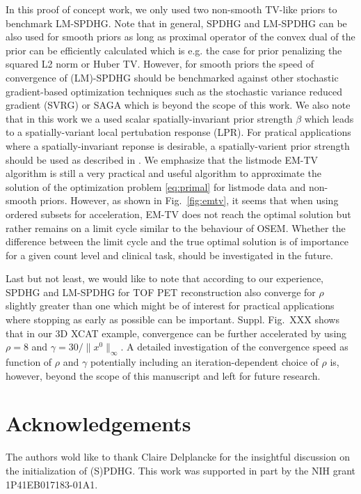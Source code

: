 In this proof of concept work, we only used two non-smooth TV-like priors
to benchmark LM-SPDHG. 
Note that in general, SPDHG and LM-SPDHG can be also used for smooth priors as long
as proximal operator of the convex dual of the prior can be efficiently calculated which is
e.g. the case for prior penalizing the squared L2 norm or Huber TV.
However, for smooth priors the speed of convergence of (LM)-SPDHG should be benchmarked against
other stochastic gradient-based optimization techniques such as the stochastic variance reduced gradient (SVRG) \cite{Johnson2013} or SAGA \cite{Defazio2014} which is beyond the scope of this work.
We also note that in this work we a used scalar spatially-invariant prior strength $\beta$ which
leads to a spatially-variant local pertubation response (LPR). 
For pratical applications where a spatially-invariant reponse is desirable, a spatially-varient prior 
strength should be used as described in \cite{Ahn2008,Tsai2020}.
We emphasize that the listmode EM-TV algorithm
is still a very practical and useful algorithm to approximate the solution 
of the optimization problem \eqref{eq:primal} for listmode data and non-smooth priors.
However, as shown in Fig.~\ref{fig:emtv}, it seems that when using ordered subsets for acceleration,
EM-TV does not reach the optimal solution but rather remains on a limit cycle similar to the
behaviour of OSEM.
Whether the difference between the limit cycle and the true optimal solution is of importance
for a given count level and clinical task, should be investigated in the future.

Last but not least, we would like to note that according to our experience, SPDHG and LM-SPDHG
for TOF PET reconstruction also converge for $\rho$ slightly greater than one which might
be of interest for practical applications where stopping as early as possible can be important.
Suppl. Fig.~XXX shows that in our 3D XCAT example, convergence can be further accelerated by
using $\rho = 8$ and $\gamma = 30/ \|x^0\|_\infty$.
A detailed investigation of the convergence speed as function of $\rho$ and $\gamma$ potentially
including an iteration-dependent choice of $\rho$ is, however, beyond the scope of this manuscript
and left for future research.

\section*{Acknowledgements}

The authors wold like to thank Claire Delplancke for the insightful discussion on the
initialization of (S)PDHG.
This work was supported in part by the NIH grant 1P41EB017183-01A1.
